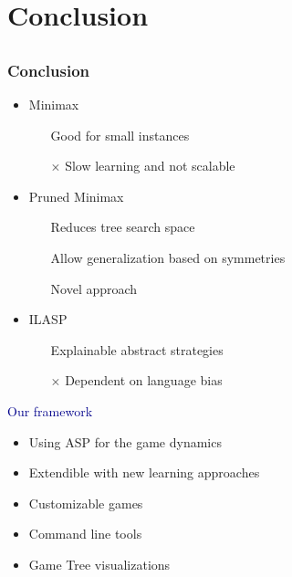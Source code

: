 \documentclass{beamer}
\newcommand\re[1]{\textcolor{darkblue}{#1}}
\begin{document}
\section{Conclusion}

\subsection{}
\begin{framefont}{\footnotesize}
  \begin{frame}
    \frametitle{Conclusion}
    \begin{multicols}{2}
    \begin{itemize}[<+->]
      \item Minimax
      \begin{itemize}
        \item[\checkmark] Good for small instances
        \item[$\times$] Slow learning and not scalable
      \end{itemize}
      \item Pruned Minimax
      \begin{itemize}
        \item[\checkmark] Reduces tree search space
        \item[\checkmark] Allow generalization based on symmetries
        \item[\checkmark] Novel approach
      \end{itemize}
      \item ILASP
      \begin{itemize}
        \item[\checkmark] Explainable abstract strategies
        \item[$\times$] Dependent on language bias
      \end{itemize}
    \end{itemize}
    \columnbreak
    \pause
    \re{Our framework}
    \pause
    \begin{itemize}[<+->]
      \item Using ASP for the game dynamics
      \item Extendible with new learning approaches
      \item Customizable games
      \item Command line tools
      \item Game Tree visualizations
    \end{itemize}
  \end{multicols}
    

  \end{frame}
\end{framefont}
\end{document}
